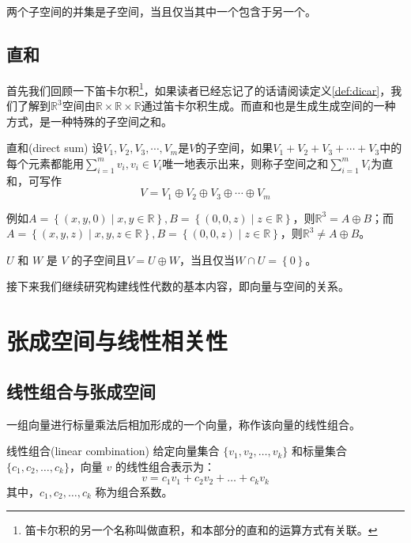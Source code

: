 \begin{corollary}
	两个子空间的并集是子空间，当且仅当其中一个包含于另一个。
\end{corollary}

\subsection{直和}

首先我们回顾一下笛卡尔积\footnote{笛卡尔积的另一个名称叫做直积，和本部分的直和的运算方式有关联。}，如果读者已经忘记了的话请阅读定义\ref{def:dicar}，我们了解到$\mathbb{R}^3$空间由$\mathbb{R}\times\mathbb{R}\times\mathbb{R}$通过笛卡尔积生成。而直和也是生成生成空间的一种方式，是一种特殊的子空间之和。

\begin{definition}{直和(direct sum)}
	设$V_1,V_2,V_3,\cdots,V_m$是$V$的子空间，如果$V_1+V_2+V_3+\cdots+V_3$中的每个元素都能用$\sum_{i=1}^{m}v_i ,v_i\in V_i$唯一地表示出来，则称子空间之和$\sum_{i=1}^{m}V_i $为直和，可写作$$V=V_1\oplus V_2\oplus V_3\oplus \cdots \oplus V_m$$
\end{definition}

例如$A=\left\{ (x,y,0)\mid x,y \in \mathbb{R} \right\},B=\left\{ (0,0,z)\mid z\in \mathbb{R} \right\}$，则$\mathbb{R}^3=A \oplus B$；而$A=\left\{ (x,y,z)\mid x,y,z \in \mathbb{R} \right\},B=\left\{ (0,0,z)\mid z\in \mathbb{R} \right\}$，则$\mathbb{R}^3\neq A \oplus B$。

\begin{corollary}
	$U$ 和 $W$ 是 $V$ 的子空间且$V=U\oplus W$，当且仅当$W\cap U=\left\{ 0 \right\}$。
\end{corollary}

接下来我们继续研究构建线性代数的基本内容，即向量与空间的关系。

\section{张成空间与线性相关性}

\subsection{线性组合与张成空间}

一组向量进行标量乘法后相加形成的一个向量，称作该向量的线性组合。

\begin{definition}{线性组合(linear combination)}
	给定向量集合 $\{v_1, v_2, \dots, v_k\}$ 和标量集合 $\{c_1, c_2, \dots, c_k\}$，向量 $v$ 的线性组合表示为：$$v = c_1 v_1 + c_2 v_2 + \dots + c_k v_k$$其中，$c_1, c_2, \dots, c_k$ 称为组合系数。
\end{definition}

